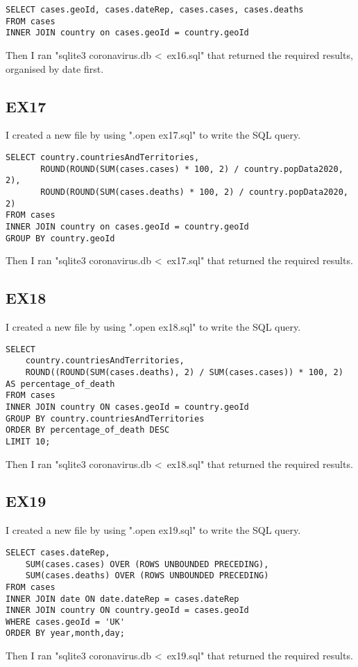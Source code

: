 \documentclass{article}
\begin{document}
\begin{verbatim}
SELECT cases.geoId, cases.dateRep, cases.cases, cases.deaths
FROM cases
INNER JOIN country on cases.geoId = country.geoId
\end{verbatim}

Then I ran "sqlite3 coronavirus.db \textless\ ex16.sql" that returned the required results, organised by date first.

\subsection{EX17}

I created a new file by using ".open ex17.sql" to write the SQL query.

\begin{verbatim}
SELECT country.countriesAndTerritories,
       ROUND(ROUND(SUM(cases.cases) * 100, 2) / country.popData2020, 2),
       ROUND(ROUND(SUM(cases.deaths) * 100, 2) / country.popData2020, 2)
FROM cases
INNER JOIN country on cases.geoId = country.geoId
GROUP BY country.geoId
\end{verbatim}

Then I ran "sqlite3 coronavirus.db \textless\ ex17.sql" that returned the required results.

\subsection{EX18}

I created a new file by using ".open ex18.sql" to write the SQL query.

\begin{verbatim}
SELECT
    country.countriesAndTerritories,
    ROUND((ROUND(SUM(cases.deaths), 2) / SUM(cases.cases)) * 100, 2) AS percentage_of_death
FROM cases
INNER JOIN country ON cases.geoId = country.geoId
GROUP BY country.countriesAndTerritories
ORDER BY percentage_of_death DESC
LIMIT 10;
\end{verbatim}

Then I ran "sqlite3 coronavirus.db \textless\ ex18.sql" that returned the required results.

\subsection{EX19}

I created a new file by using ".open ex19.sql" to write the SQL query.

\begin{verbatim}
SELECT cases.dateRep,
    SUM(cases.cases) OVER (ROWS UNBOUNDED PRECEDING),
	SUM(cases.deaths) OVER (ROWS UNBOUNDED PRECEDING)
FROM cases
INNER JOIN date ON date.dateRep = cases.dateRep
INNER JOIN country ON country.geoId = cases.geoId
WHERE cases.geoId = 'UK'
ORDER BY year,month,day;
\end{verbatim}

Then I ran "sqlite3 coronavirus.db \textless\ ex19.sql" that returned the required results.
\end{document}
